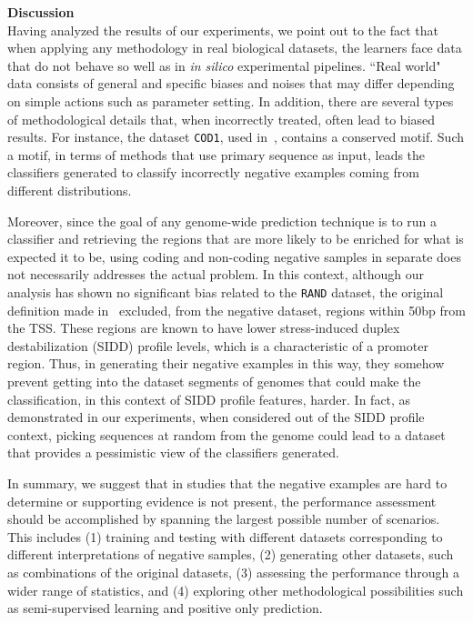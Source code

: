 \documentclass[conference,letterpaper]{IEEEtran}
\begin{document}
\noindent
{\bf Discussion} \\

Having analyzed the results of our experiments, we point out to the fact that when applying any methodology in real biological datasets, the learners face data that do not behave so well as in \emph{in silico} experimental pipelines. ``Real world" data consists of general and specific biases and noises that may differ depending on simple actions such as parameter setting. In addition, there are several  types of methodological details that, when incorrectly treated, often lead to biased results. For instance, the dataset {\tt COD1}, used in~\cite{gordon2003,song2011a}, contains a conserved motif. Such a motif, in terms of methods that use primary sequence as input, leads the classifiers generated to classify incorrectly negative examples coming from different distributions.

Moreover, since the goal of any genome-wide prediction technique is to run a classifier and retrieving the regions that are more likely to be enriched for what  is expected it to be, using coding and non-coding negative samples in separate does not necessarily addresses the actual problem. In this context, although our analysis has shown no significant bias related to the {\tt RAND} dataset, the original definition made in~\cite{bland2010} excluded, from the negative dataset, regions within 50bp from the TSS. These regions are known to have lower stress-induced duplex destabilization (SIDD) profile levels, which is a characteristic of a promoter region. Thus, in generating their negative examples in this way, they somehow prevent getting into the dataset segments of genomes that could make the classification, in this context of SIDD profile features, harder. In fact, as demonstrated  in our experiments, when considered out of the SIDD profile context, picking sequences at random from the genome could lead to a dataset that provides a pessimistic view of the classifiers generated.

In summary, we suggest that in studies that the negative examples are hard to determine or supporting evidence is not present, the performance assessment should be accomplished by spanning the largest possible number of scenarios. This includes (1) training and testing with different datasets corresponding to different interpretations of negative samples, (2) generating other datasets, such as combinations of the original datasets, (3) assessing the performance through a wider range of statistics, and (4) exploring other methodological possibilities such as semi-supervised learning and positive only prediction.
\end{document}

